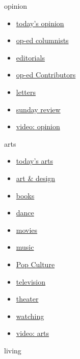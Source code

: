 opinion

\begin{itemize}
\tightlist
\item
  \href{https://www.nytimes.com/section/opinion}{today's opinion}
\item
  \href{https://www.nytimes.com/section/opinion/columnists}{op-ed
  columnists}
\item
  \href{https://www.nytimes.com/section/opinion/editorials}{editorials}
\item
  \href{https://www.nytimes.com/section/opinion/contributors}{op-ed
  Contributors}
\item
  \href{https://www.nytimes.com/section/opinion/letters}{letters}
\item
  \href{https://www.nytimes.com/section/opinion/sunday}{sunday review}
\item
  \href{https://www.nytimes.com/video/opinion}{video: opinion}
\end{itemize}

arts

\begin{itemize}
\tightlist
\item
  \href{https://www.nytimes.com/section/arts}{today's arts}
\item
  \href{https://www.nytimes.com/section/arts/design}{art \& design}
\item
  \href{https://www.nytimes.com/section/books}{books}
\item
  \href{https://www.nytimes.com/section/arts/dance}{dance}
\item
  \href{https://www.nytimes.com/section/movies}{movies}
\item
  \href{https://www.nytimes.com/section/arts/music}{music}
\item
  \href{https://www.nytimes.com/spotlight/pop-culture}{Pop Culture}
\item
  \href{https://www.nytimes.com/section/arts/television}{television}
\item
  \href{https://www.nytimes.com/section/theater}{theater}
\item
  \href{https://www.nytimes.com/watching}{watching}
\item
  \href{https://www.nytimes.com/video/arts}{video: arts}
\end{itemize}

living


